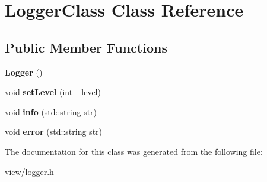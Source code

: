 \hypertarget{class_logger_class}{\section{Logger\-Class Class Reference}
\label{class_logger_class}
}
\subsection*{Public Member Functions}
\begin{DoxyCompactItemize}
\item 
\hypertarget{class_logger_class_ab4d5a4f2a34091fb11c17bfc1f416b70}{{\bfseries Logger} ()}\label{class_logger_class_ab4d5a4f2a34091fb11c17bfc1f416b70}

\item 
\hypertarget{class_logger_class_aae76d35503b2ed0ea046a222868562b2}{void {\bfseries set\-Level} (int \-\_\-level)}\label{class_logger_class_aae76d35503b2ed0ea046a222868562b2}

\item 
\hypertarget{class_logger_class_a0fab2d135f532a6abfa598516acfd733}{void {\bfseries info} (std\-::string str)}\label{class_logger_class_a0fab2d135f532a6abfa598516acfd733}

\item 
\hypertarget{class_logger_class_ac56fe482f756dca67e9af56096c2122d}{void {\bfseries error} (std\-::string str)}\label{class_logger_class_ac56fe482f756dca67e9af56096c2122d}

\end{DoxyCompactItemize}


The documentation for this class was generated from the following file\-:\begin{DoxyCompactItemize}
\item 
view/logger.\-h\end{DoxyCompactItemize}
